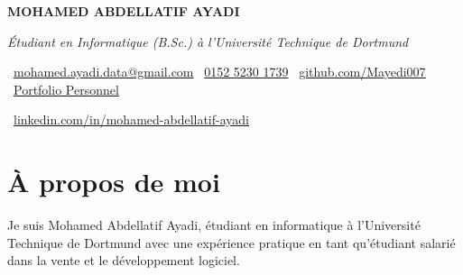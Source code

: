 \documentclass[10pt, letterpaper]{article}
\newenvironment{header}{
    \setlength{\topsep}{0pt}\par\kern\topsep\centering\linespread{1.5}
}{
    \par\kern\topsep
} %
\begin{document}
    \newcommand{\AND}{\unskip
        \cleaders\copy\ANDbox\hskip\wd\ANDbox
        \ignorespaces
    }
    \newsavebox\ANDbox
    \sbox\ANDbox{$|$}

    \begin{header}
   \begin{center}

    \vspace{0.5cm} %
    {\fontsize{20pt}{24pt}\selectfont \textbf{MOHAMED ABDELLATIF AYADI}}
\end{center}
        
\vspace{5 pt}

    \normalsize
    \textit{Étudiant en Informatique (B.Sc.) à l'Université Technique de Dortmund}

        \vspace{5 pt}

      \faEnvelope\ \href{mailto:mohamed.ayadi.data@gmail.com}{\textcolor{primaryColor}{mohamed.ayadi.data@gmail.com}} \quad
\faPhone\ \href{tel:+49-152-5230-1739}{\textcolor{primaryColor}{0152 5230 1739}} \quad
\faGithub\ \href{https://github.com/Mayedi007}{\textcolor{primaryColor}{github.com/Mayedi007}} \quad
\faGlobe\ \href{https://personal-portfolio-mohamedayadidat.replit.app}{\textcolor{portfolioColor}{Portfolio Personnel}} \quad

\faLinkedin\ \href{https://linkedin.com/in/mohamed-abdellatif-ayadi}{\textcolor{primaryColor}{linkedin.com/in/mohamed-abdellatif-ayadi}}

        
        
    \end{header}

    \vspace{1cm}



\section*{À propos de moi}

Je suis Mohamed Abdellatif Ayadi, étudiant en informatique à l'Université Technique de Dortmund avec une expérience pratique en tant qu'étudiant salarié dans la vente et le développement logiciel.
\end{document}
